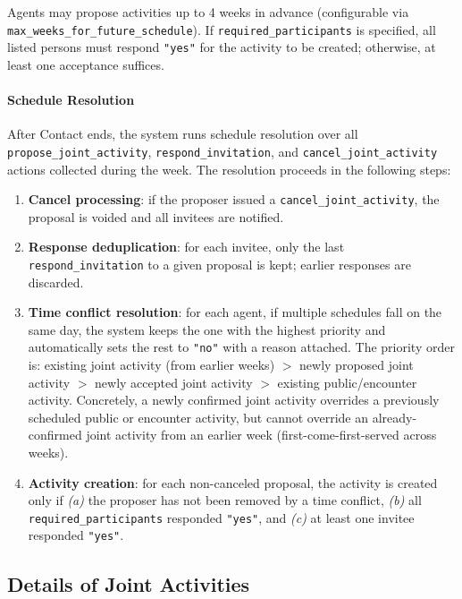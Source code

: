 Agents may propose activities up to 4 weeks in advance (configurable via \texttt{max\_weeks\_for\_future\_schedule}).
If \texttt{required\_participants} is specified, all listed persons must respond \texttt{"yes"} for the activity to be created; otherwise, at least one acceptance suffices.

\paragraph{Schedule Resolution}
After Contact ends, the system runs schedule resolution over all \texttt{propose\_joint\_activity}, \texttt{respond\_invitation}, and \texttt{cancel\_joint\_activity} actions collected during the week.
The resolution proceeds in the following steps:
\begin{enumerate}[nosep]
\item \textbf{Cancel processing}: if the proposer issued a \texttt{cancel\_joint\_activity}, the proposal is voided and all invitees are notified.
\item \textbf{Response deduplication}: for each invitee, only the last \texttt{respond\_invitation} to a given proposal is kept; earlier responses are discarded.
\item \textbf{Time conflict resolution}: for each agent, if multiple schedules fall on the same day, the system keeps the one with the highest priority and automatically sets the rest to \texttt{"no"} with a reason attached. The priority order is: existing joint activity (from earlier weeks) $>$ newly proposed joint activity $>$ newly accepted joint activity $>$ existing public/encounter activity. Concretely, a newly confirmed joint activity overrides a previously scheduled public or encounter activity, but cannot override an already-confirmed joint activity from an earlier week (first-come-first-served across weeks).
\item \textbf{Activity creation}: for each non-canceled proposal, the activity is created only if \textit{(a)} the proposer has not been removed by a time conflict, \textit{(b)} all \texttt{required\_participants} responded \texttt{"yes"}, and \textit{(c)} at least one invitee responded \texttt{"yes"}.
\end{enumerate}


\subsection{Details of Joint Activities}
\label{sec:appendix_activity}

